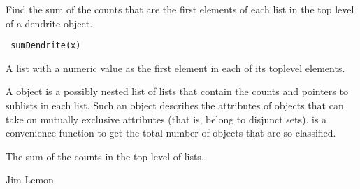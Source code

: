 \begin{Description}\relax
Find the sum of the counts that are the first elements of each
list in the top level of a dendrite object.
\end{Description}
\begin{Usage}
\begin{verbatim} sumDendrite(x) \end{verbatim}
\end{Usage}
\begin{Arguments}
\begin{ldescription}
\item[\code{x}] A list with a numeric value as the first element in each of its
toplevel elements.
\end{ldescription}
\end{Arguments}
\begin{Details}\relax
A  object is a possibly nested list of lists that contain the
counts and pointers to sublists in each list. Such an object describes the 
attributes of objects that can take on mutually exclusive attributes (that is,
belong to disjunct sets).  is a convenience function to get
the total number of objects that are so classified.
\end{Details}
\begin{Value}
The sum of the counts in the top level of lists.
\end{Value}
\begin{Author}\relax
Jim Lemon
\end{Author}
\begin{SeeAlso}\relax
{}
\end{SeeAlso}

